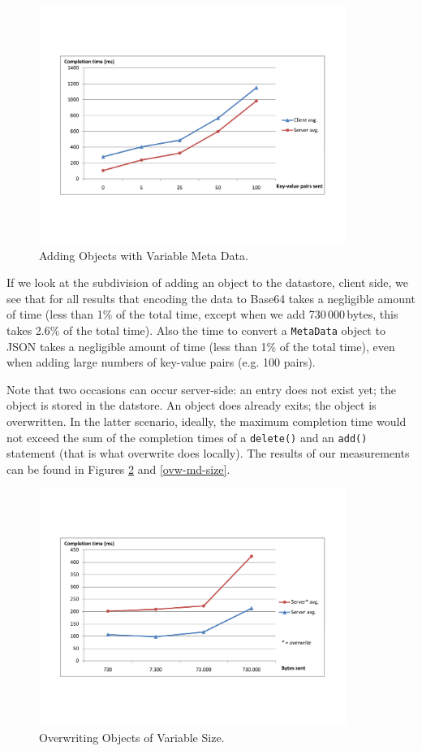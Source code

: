 \begin{figure} %
\begin{center}
\includegraphics[trim=5cm 4cm 5cm 5cm,width=10cm]{./figures/add_md.pdf}
\caption{Adding Objects with Variable Meta Data. \label{add-md-size}}
\end{center}
\end{figure}

If we look at the subdivision of adding an object to the datastore, client side,
we see that for all results that encoding the data to Base64 takes a negligible
amount of time (less than 1\% of the total time, except when we add
730\,000\,bytes, this takes 2.6\% of the total time). Also the time to convert a
\texttt{MetaData} object to JSON takes a negligible amount of time (less than 1\%
of the total time), even when adding large numbers of key-value pairs (e.g. 100
pairs).

Note that two occasions can occur server-side: an entry does not exist yet; the
object is stored in the datstore. An object does already exits; the object is
overwritten. In the latter scenario, ideally, the maximum completion time would
not exceed the sum of the completion times of a \texttt{delete()} and an
\texttt{add()} statement (that is what overwrite does locally). The results of
our measurements can be found in Figures \ref{ovw-obj-size} and
\ref{ovw-md-size}.

\begin{figure} %
\begin{center}
\includegraphics[trim=5cm 4cm 5cm 5cm,width=10cm]{./figures/ovw_obj.pdf}
\caption{Overwriting Objects of Variable Size. \label{ovw-obj-size}}
\end{center}
\end{figure}

